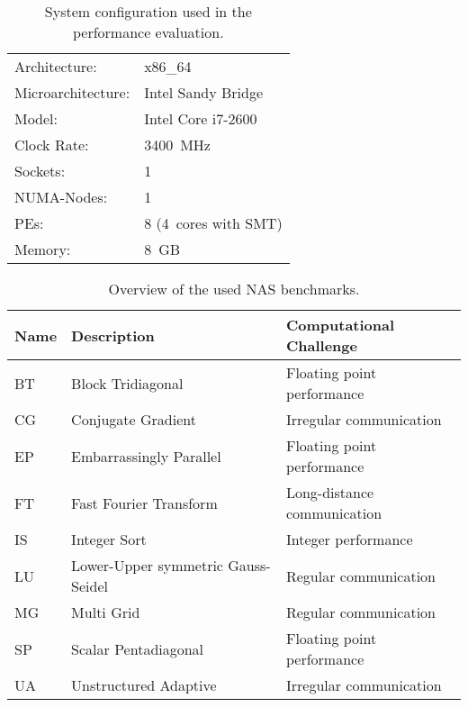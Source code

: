 \begin{table}[!b]
	\caption{System configuration used in the performance evaluation.}%
	\label{tbl:experiments:performance}
	\begin{tabular}{ll}\toprule
		Architecture:      & x86\_64              \\
		Microarchitecture: & Intel Sandy Bridge   \\
		Model:             & Intel Core i7-2600   \\
		Clock Rate:        & 3400~MHz             \\
		Sockets:           & 1                    \\
		NUMA-Nodes:        & 1                    \\
		\acp{PE}:          & 8 (4~cores with SMT) \\
		Memory:            & 8~GB                 \\ \bottomrule
	\end{tabular}
\end{table}

\begin{table}[!b]
	\caption{Overview of the used NAS benchmarks.}%
	\label{tab:nas}
	\renewcommand{\arraystretch}{1.1}
	\centering
	\begin{tabular}{m{0.9cm}m{3.75cm}m{5cm}}
		\toprule
		Name & Description                               & Computational Challenge     \\
		\midrule
		BT   & Block Tridiagonal                         & Floating point performance  \\
		CG   & Conjugate Gradient                        & Irregular communication     \\
		EP   & Embarrassingly Parallel                   & Floating point performance  \\
		FT   & Fast Fourier Transform                    & Long-distance communication \\
		IS   & Integer Sort                              & Integer performance         \\
		LU   & Lower-Upper symmetric \mbox{Gauss-Seidel} & Regular communication       \\
		MG   & Multi Grid                                & Regular communication       \\
		SP   & Scalar Pentadiagonal                      & Floating point performance  \\
		UA   & Unstructured Adaptive                     & Irregular communication     \\
		\bottomrule
	\end{tabular}
\end{table}

